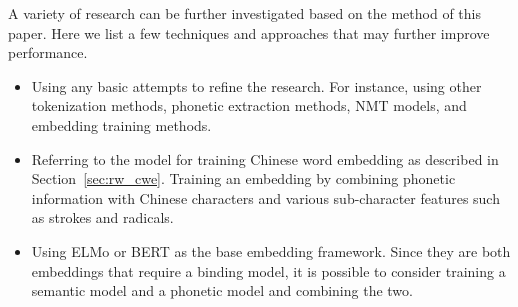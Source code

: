 A variety of research can be further investigated based on the method of this paper.
Here we list a few techniques and approaches that may further improve performance.

\begin{itemize}
    \item Using any basic attempts to refine the research. For instance, using other tokenization methods, phonetic extraction methods, NMT models, and embedding training methods.
    \item Referring to the model for training Chinese word embedding as described in Section~\ref{sec:rw_cwe}. Training an embedding by combining phonetic information with Chinese characters and various sub-character features such as strokes and radicals.
    \item Using ELMo or BERT as the base embedding framework. Since they are both embeddings that require a binding model, it is possible to consider training a semantic model and a phonetic model and combining the two.
\end{itemize}

